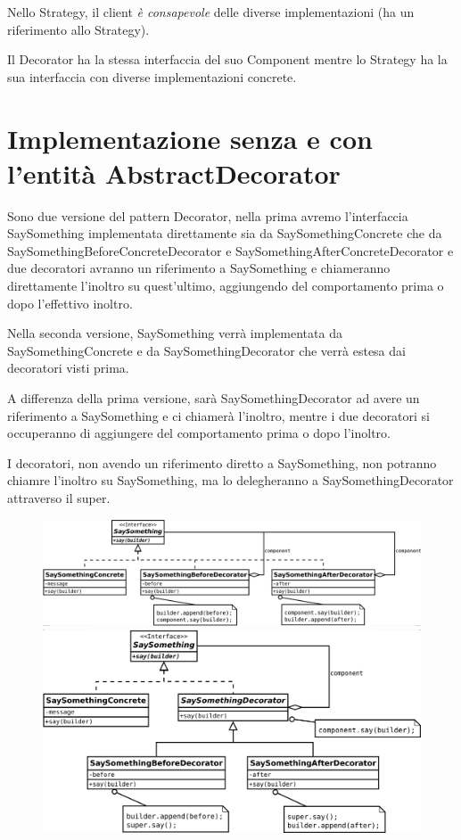 Nello Strategy, il client \textit{è consapevole} delle diverse implementazioni (ha un riferimento allo Strategy).

Il Decorator ha la stessa interfaccia del suo Component mentre lo Strategy ha la sua interfaccia con diverse implementazioni concrete.

\section{Implementazione senza e con l'entità AbstractDecorator}

Sono due versione del pattern Decorator, nella prima avremo l'interfaccia SaySomething implementata direttamente sia da SaySomethingConcrete che da 
SaySomethingBeforeConcreteDecorator e SaySomethingAfterConcreteDecorator e due decoratori avranno un riferimento a SaySomething e chiameranno direttamente l'inoltro 
su quest'ultimo, aggiungendo del comportamento prima o dopo l'effettivo inoltro.

Nella seconda versione, SaySomething verrà implementata da SaySomethingConcrete e da SaySomethingDecorator che verrà estesa dai decoratori visti prima.

A differenza della prima versione, sarà SaySomethingDecorator ad avere un riferimento a SaySomething e ci chiamerà l'inoltro, mentre i due decoratori si occuperanno di 
aggiungere del comportamento prima o dopo l'inoltro.

I decoratori, non avendo un riferimento diretto a SaySomething, non potranno chiamre l'inoltro su SaySomething, ma lo delegheranno a SaySomethingDecorator attraverso 
il super.

\begin{figure}[H]
\begin{minipage}[c]{9cm}
    \includegraphics[width=1\linewidth]{../../immagini/decorator/senza_AbstractDecorator}
\end{minipage}
\hfill
\begin{minipage}[c]{8cm}
    \includegraphics[width=1\linewidth]{../../immagini/decorator/con_AbstractDecorator}
\end{minipage}
\end{figure}

